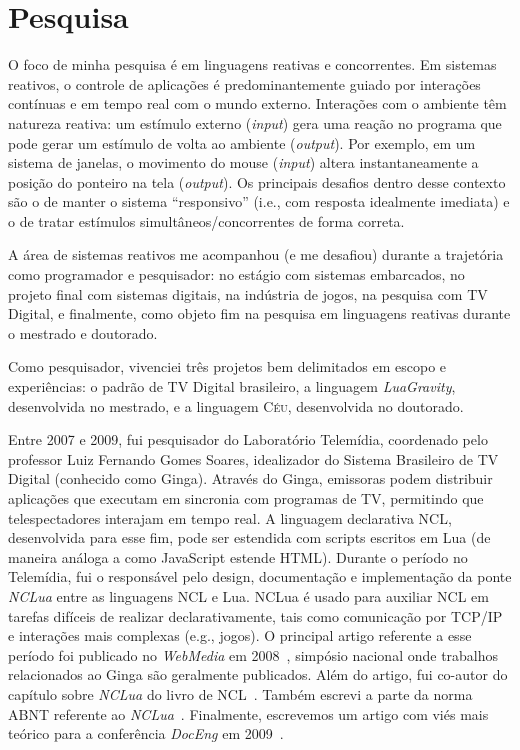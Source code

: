 \documentclass[12pt,a4paper]{article}
\newcommand{\CEU}{\textsc{C\'{e}u}\xspace}
\newcommand{\GVT}{\emph{LuaGravity}\xspace}
\begin{document}
\section*{Pesquisa}

O foco de minha pesquisa é em linguagens reativas e concorrentes.
%
Em sistemas reativos, o controle de aplicações é predominantemente guiado por 
interações contínuas e em tempo real com o mundo externo.
%
Interações com o ambiente têm natureza reativa: um estímulo externo 
(\emph{input}) gera uma reação no programa que pode gerar um estímulo de volta 
ao ambiente (\emph{output}).
%
Por exemplo, em um sistema de janelas, o movimento do mouse (\emph{input}) 
altera instantaneamente a posição do ponteiro na tela (\emph{output}).
%
Os principais desafios dentro desse contexto são o de manter o sistema 
``responsivo'' (i.e., com resposta idealmente imediata) e o de tratar estímulos 
simultâneos/concorrentes de forma correta.

A área de sistemas reativos me acompanhou (e me desafiou) durante a trajetória 
como programador e pesquisador:
no estágio com sistemas embarcados, no projeto final com sistemas digitais, na 
indústria de jogos, na pesquisa com TV Digital, e finalmente, como objeto fim 
na pesquisa em linguagens reativas durante o mestrado e doutorado.

Como pesquisador, vivenciei três projetos bem delimitados em escopo e 
experiências: o padrão de TV Digital brasileiro, a linguagem \GVT, desenvolvida 
no mestrado, e a linguagem \CEU, desenvolvida no doutorado.

Entre 2007 e 2009, fui pesquisador do Laboratório Telemídia, coordenado pelo 
professor Luiz Fernando Gomes Soares, idealizador do Sistema Brasileiro de TV 
Digital (conhecido como Ginga).
%
Através do Ginga, emissoras podem distribuir aplicações que executam em 
sincronia com programas de TV, permitindo que telespectadores interajam em 
tempo real.
%
A linguagem declarativa NCL, desenvolvida para esse fim, pode ser estendida com 
scripts escritos em Lua (de maneira análoga a como JavaScript estende HTML).
%
Durante o período no Telemídia, fui o responsável pelo design, documentação e 
implementação da ponte \emph{NCLua} entre as linguagens NCL e Lua.
%
NCLua é usado para auxiliar NCL em tarefas difíceis de realizar 
declarativamente, tais como comunicação por TCP/IP e interações mais complexas 
(e.g., jogos).
%
O principal artigo referente a esse período foi publicado no \emph{WebMedia} em 
2008~\cite{nclua.webmedia}, simpósio nacional onde trabalhos relacionados ao 
Ginga são geralmente publicados.
Além do artigo, fui co-autor do capítulo sobre \emph{NCLua} do livro de 
NCL~\cite{nclua.book}.
Também escrevi a parte da norma ABNT referente ao 
\emph{NCLua}~\cite{nclua.abnt}.
Finalmente, escrevemos um artigo com viés mais teórico para a conferência 
\emph{DocEng} em 2009~\cite{nclua.doceng}.
\end{document}
